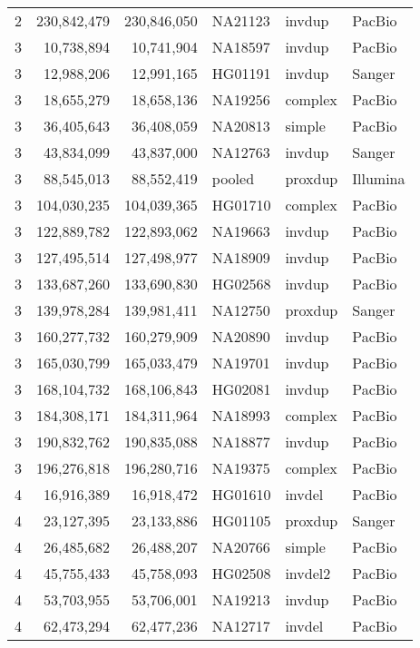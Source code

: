 {\begin{tiny}
\begin{longtable}{rrrlll}
    2   & 230,842,479 & 230,846,050 & NA21123 & invdup  & PacBio  \\
    3   & 10,738,894  & 10,741,904  & NA18597 & invdup  & PacBio  \\
    3   & 12,988,206  & 12,991,165  & HG01191 & invdup  & Sanger  \\
    3   & 18,655,279  & 18,658,136  & NA19256 & complex & PacBio  \\
    3   & 36,405,643  & 36,408,059  & NA20813 & simple  & PacBio  \\
    3   & 43,834,099  & 43,837,000  & NA12763 & invdup  & Sanger  \\
    3   & 88,545,013  & 88,552,419  & pooled  & proxdup & Illumina  \\
    3   & 104,030,235 & 104,039,365 & HG01710 & complex & PacBio  \\
    3   & 122,889,782 & 122,893,062 & NA19663 & invdup  & PacBio  \\
    3   & 127,495,514 & 127,498,977 & NA18909 & invdup  & PacBio  \\
    3   & 133,687,260 & 133,690,830 & HG02568 & invdup  & PacBio  \\
    3   & 139,978,284 & 139,981,411 & NA12750 & proxdup & Sanger  \\
    3   & 160,277,732 & 160,279,909 & NA20890 & invdup  & PacBio  \\
    3   & 165,030,799 & 165,033,479 & NA19701 & invdup  & PacBio  \\
    3   & 168,104,732 & 168,106,843 & HG02081 & invdup  & PacBio  \\
    3   & 184,308,171 & 184,311,964 & NA18993 & complex & PacBio  \\
    3   & 190,832,762 & 190,835,088 & NA18877 & invdup  & PacBio  \\
    3   & 196,276,818 & 196,280,716 & NA19375 & complex & PacBio  \\
    4   & 16,916,389  & 16,918,472  & HG01610 & invdel  & PacBio  \\
    4   & 23,127,395  & 23,133,886  & HG01105 & proxdup & Sanger  \\
    4   & 26,485,682  & 26,488,207  & NA20766 & simple  & PacBio  \\
    4   & 45,755,433  & 45,758,093  & HG02508 & invdel2 & PacBio  \\
    4   & 53,703,955  & 53,706,001  & NA19213 & invdup  & PacBio  \\
    4   & 62,473,294  & 62,477,236  & NA12717 & invdel  & PacBio  \\

\end{longtable}
\end{tiny}}
